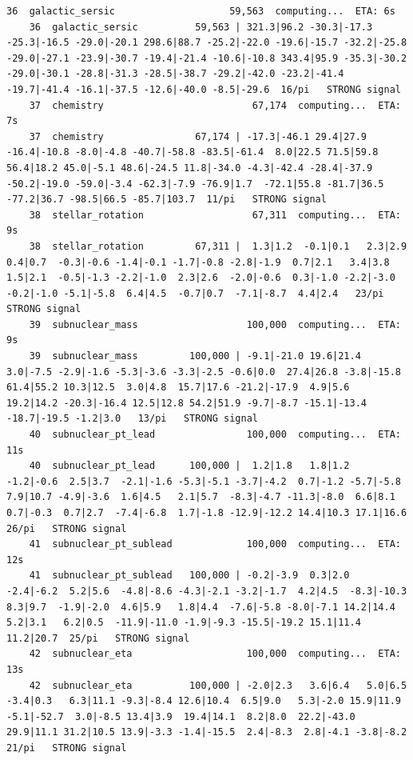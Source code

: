 \documentclass[11pt, letterpaper, openany]{book}
\begin{document}
\begin{empiricalbox}
\begin{lstlisting}[style=terminal]
    36  galactic_sersic                    59,563  computing...  ETA: 6s
    36  galactic_sersic          59,563 | 321.3|96.2 -30.3|-17.3 -25.3|-16.5 -29.0|-20.1 298.6|88.7 -25.2|-22.0 -19.6|-15.7 -32.2|-25.8 -29.0|-27.1 -23.9|-30.7 -19.4|-21.4 -10.6|-10.8 343.4|95.9 -35.3|-30.2 -29.0|-30.1 -28.8|-31.3 -28.5|-38.7 -29.2|-42.0 -23.2|-41.4 -19.7|-41.4 -16.1|-37.5 -12.6|-40.0 -8.5|-29.6  16/pi   STRONG signal
    37  chemistry                          67,174  computing...  ETA: 7s
    37  chemistry                67,174 | -17.3|-46.1 29.4|27.9 -16.4|-10.8 -8.0|-4.8 -40.7|-58.8 -83.5|-61.4  8.0|22.5 71.5|59.8 56.4|18.2 45.0|-5.1 48.6|-24.5 11.8|-34.0 -4.3|-42.4 -28.4|-37.9 -50.2|-19.0 -59.0|-3.4 -62.3|-7.9 -76.9|1.7  -72.1|55.8 -81.7|36.5 -77.2|36.7 -98.5|66.5 -85.7|103.7  11/pi   STRONG signal
    38  stellar_rotation                   67,311  computing...  ETA: 9s
    38  stellar_rotation         67,311 |  1.3|1.2  -0.1|0.1   2.3|2.9   0.4|0.7  -0.3|-0.6 -1.4|-0.1 -1.7|-0.8 -2.8|-1.9  0.7|2.1   3.4|3.8   1.5|2.1  -0.5|-1.3 -2.2|-1.0  2.3|2.6  -2.0|-0.6  0.3|-1.0 -2.2|-3.0 -0.2|-1.0 -5.1|-5.8  6.4|4.5  -0.7|0.7  -7.1|-8.7  4.4|2.4   23/pi   STRONG signal
    39  subnuclear_mass                   100,000  computing...  ETA: 9s
    39  subnuclear_mass         100,000 | -9.1|-21.0 19.6|21.4  3.0|-7.5 -2.9|-1.6 -5.3|-3.6 -3.3|-2.5 -0.6|0.0  27.4|26.8 -3.8|-15.8 61.4|55.2 10.3|12.5  3.0|4.8  15.7|17.6 -21.2|-17.9  4.9|5.6  19.2|14.2 -20.3|-16.4 12.5|12.8 54.2|51.9 -9.7|-8.7 -15.1|-13.4 -18.7|-19.5 -1.2|3.0   13/pi   STRONG signal
    40  subnuclear_pt_lead                100,000  computing...  ETA: 11s
    40  subnuclear_pt_lead      100,000 |  1.2|1.8   1.8|1.2  -1.2|-0.6  2.5|3.7  -2.1|-1.6 -5.3|-5.1 -3.7|-4.2  0.7|-1.2 -5.7|-5.8  7.9|10.7 -4.9|-3.6  1.6|4.5   2.1|5.7  -8.3|-4.7 -11.3|-8.0  6.6|8.1   0.7|-0.3  0.7|2.7  -7.4|-6.8  1.7|-1.8 -12.9|-12.2 14.4|10.3 17.1|16.6  26/pi   STRONG signal
    41  subnuclear_pt_sublead             100,000  computing...  ETA: 12s
    41  subnuclear_pt_sublead   100,000 | -0.2|-3.9  0.3|2.0  -2.4|-6.2  5.2|5.6  -4.8|-8.6 -4.3|-2.1 -3.2|-1.7  4.2|4.5  -8.3|-10.3  8.3|9.7  -1.9|-2.0  4.6|5.9   1.8|4.4  -7.6|-5.8 -8.0|-7.1 14.2|14.4  5.2|3.1   6.2|0.5  -11.9|-11.0 -1.9|-9.3 -15.5|-19.2 15.1|11.4 11.2|20.7  25/pi   STRONG signal
    42  subnuclear_eta                    100,000  computing...  ETA: 13s
    42  subnuclear_eta          100,000 | -2.0|2.3   3.6|6.4   5.0|6.5  -3.4|0.3   6.3|11.1 -9.3|-8.4 12.6|10.4  6.5|9.0   5.3|-2.0 15.9|11.9 -5.1|-52.7  3.0|-8.5 13.4|3.9  19.4|14.1  8.2|8.0  22.2|-43.0 29.9|11.1 31.2|10.5 13.9|-3.3 -1.4|-15.5  2.4|-8.3  2.8|-4.1 -3.8|-8.2  21/pi   STRONG signal

\end{lstlisting}
\end{empiricalbox}
\end{document}
